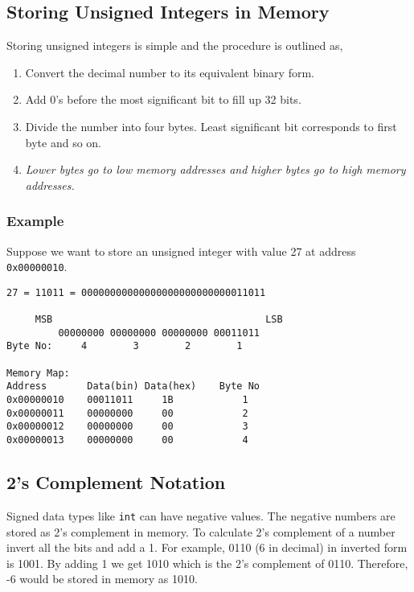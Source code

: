 \documentclass[12pt,a4paper]{article}
\begin{document}
\subsection{Storing Unsigned Integers in Memory}
Storing unsigned integers is simple and the procedure is outlined as,
\begin{enumerate}
\item Convert the decimal number to its equivalent binary form.
\item Add 0's before the most significant bit to fill up 32 bits\footnotemark[2].
\item Divide the number into four bytes. Least significant bit corresponds to first byte and so on.
\item \emph{Lower bytes go to low memory addresses and higher bytes go to high memory addresses.}
\end{enumerate}
\subsubsection{Example}
Suppose we want to store an unsigned integer with value 27 at address \verb|0x00000010|.

\begin{verbatim}
27 = 11011 = 00000000000000000000000000011011

     MSB                                     LSB
         00000000 00000000 00000000 00011011
Byte No:     4        3        2        1

Memory Map:
Address       Data(bin) Data(hex)    Byte No
0x00000010    00011011     1B            1
0x00000011    00000000     00            2
0x00000012    00000000     00            3
0x00000013    00000000     00            4
\end{verbatim}


\subsection{2's Complement Notation}
Signed data types like \verb|int| can have negative values. The negative numbers are stored as 2's complement in memory. To calculate 2's complement of a number invert all the bits and add a 1. For example, 0110 (6 in decimal) in inverted form is 1001. By adding 1 we get 1010 which is the 2's complement of 0110. Therefore, -6 would be stored in memory as 1010.
\end{document}
